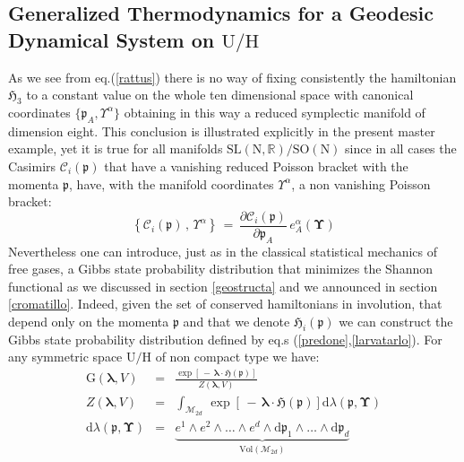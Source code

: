 \documentclass[10pt,a4paper]{article}
\begin{document}
\subsection{Generalized Thermodynamics for a Geodesic Dynamical System on $\mathrm{U/H}$} As we see from eq.(\ref{rattus}) there is no way of fixing consistently the hamiltonian $\mathfrak{H}_3$ to a  constant value on the whole ten dimensional space with canonical coordinates $\{\mathfrak{p}_A,\Upsilon^\alpha\}$ obtaining in this way  a reduced symplectic manifold of dimension eight. This conclusion is illustrated explicitly in the present master example, yet it is true for all manifolds $\mathrm{SL(N,\mathbb{R})/SO(N)}$ since in all cases the Casimirs $\mathcal{C}_i(\mathfrak{p})$ that have a vanishing reduced Poisson bracket with the momenta $\mathfrak{p}$, have, with the manifold coordinates $\Upsilon^\alpha$, a non vanishing Poisson bracket:
\begin{equation}\label{ruminante}
   \left\{\mathcal{C}_i(\mathfrak{p})\, , \, \Upsilon^\alpha \right\} \, = \,  \frac{\partial \mathcal{C}_i(\mathfrak{p})}{\partial \mathfrak{p}_A} \, e_A^\alpha(\boldsymbol{\Upsilon})
 \end{equation}
 Nevertheless one can introduce, just as in the classical statistical mechanics of free gases, a Gibbs state probability distribution that minimizes the Shannon functional as we discussed in section \ref{geostructa} and we announced in section \ref{cromatillo}. Indeed, given the set of conserved hamiltonians in involution, that depend only on the momenta $\mathfrak{p}$ and that we denote $\mathfrak{H}_i(\mathfrak{p})$ we can construct the Gibbs state probability distribution defined by eq.s (\ref{predone},\ref{larvatarlo}).
 For any symmetric space $\mathrm{U/H}$ of non compact type we have:
  \begin{eqnarray}
   \mathrm{G}(\boldsymbol{\lambda},V) &=& \frac{\exp\left[\, -\, \boldsymbol{\lambda} \cdot \boldsymbol{\mathfrak{H}}\left(
   \boldsymbol{\mathfrak{p}}\right)\right]}{Z(\boldsymbol{\lambda},V)} \label{gipsyUH} \\
   Z(\boldsymbol{\lambda},V)&=& \int_{\mathcal{M}_{2d}} \, \exp\left[\, -\, \boldsymbol{\lambda} \cdot \boldsymbol{\mathfrak{H}}\left(
   \boldsymbol{\mathfrak{p}}\right)\right] \mathrm{d}\lambda(\boldsymbol{\mathfrak{p}},\boldsymbol{\Upsilon}) \label{partfunUH}\\
   \mathrm{d}\lambda(\boldsymbol{\mathfrak{p}},\boldsymbol{\Upsilon})  &=&  \underbrace{e^1\wedge e^2 \wedge \dots \wedge e^d \wedge \mathrm{d}\mathfrak{p}_1 \wedge \dots \wedge \mathrm{d}\mathfrak{p}_d}_{\mathrm{Vol}(\mathcal{M}_{2d})} \\
 \end{eqnarray}
\end{document}
